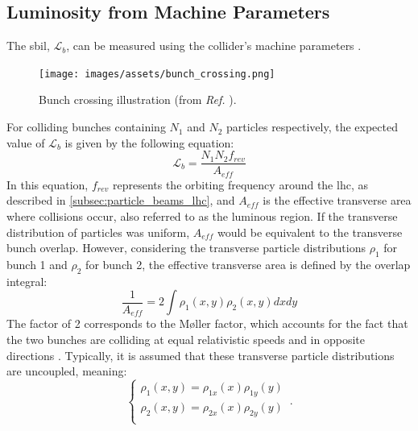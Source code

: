 \subsection{Luminosity from Machine Parameters}
\label{subsec:luminosity_from_machine_parameters}

The \acrfull{sbil}, $\mathcal{L}_b$, can be measured using the collider's machine parameters \cite{Burkhardt:1056691}.
\begin{figure}[h]
    \centering
    \texttt{[image: images/assets/bunch\_crossing.png]}
    \caption[Bunch crossing illustration]{Bunch crossing illustration (from \textit{Ref.} \cite{Burkhardt:1056691}).}
    \label{fig:bunch_crossing}
\end{figure}
For colliding bunches containing $N_1$ and $N_2$ particles respectively, the expected value of $\mathcal{L}_b$ is given by the following equation:
\begin{equation}
    \label{eq:sbil-machine-params}
    \mathcal{L}_b = \frac{N_1 N_2 f_{rev}}{A_{eff}}
\end{equation}
In this equation, $f_{rev}$ represents the orbiting frequency around the \acrshort{lhc}, as described in \autoref{subsec:particle_beams_lhc}, and $A_{eff}$ is the effective transverse area where collisions occur, also referred to as the luminous region. If the transverse distribution of particles was uniform, $A_{eff}$ would be equivalent to the transverse bunch overlap. However, considering the transverse particle distributions $\rho_1$ for bunch 1 and $\rho_2$ for bunch 2, the effective transverse area is defined by the overlap integral:
\begin{equation}
    \label{eq:effective-area}
    \frac{1}{A_{eff}} = 2 \int \rho_1(x,y) \rho_2(x,y) dxdy
\end{equation}
The factor of 2 corresponds to the Møller factor, which accounts for the fact that the two bunches are colliding at equal relativistic speeds and in opposite directions \cite{furman2003moeller}. Typically, it is assumed that these transverse particle distributions are uncoupled, meaning: 
\begin{equation}
    \begin{cases}
		\rho_1 \left(x, y \right) = \rho_{1x} \left( x \right) \rho_{1y} \left( y \right) \\
		\rho_2 \left(x, y \right) = \rho_{2x} \left( x \right) \rho_{2y} \left( y \right) \\
    \end{cases}\,.
\end{equation}
